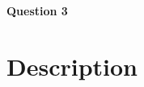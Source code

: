 \documentclass[class=article]{standalone}
\begin{document}
\centerline{\Huge \bf Question 3}
\bigskip

\section*{Description}
\end{document}

